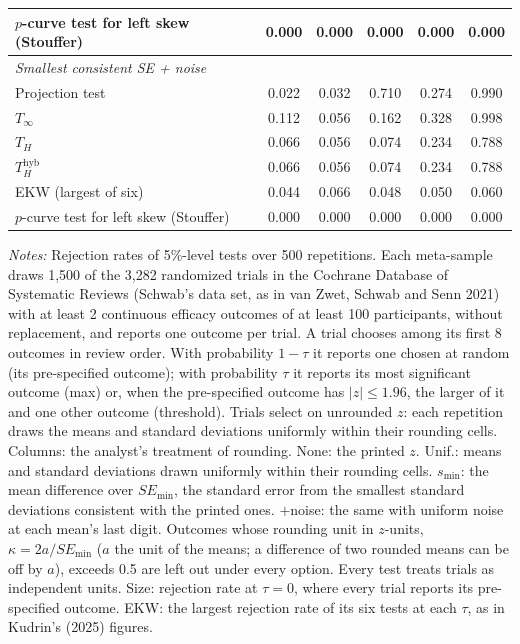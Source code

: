 \begin{table}[htbp]
\begin{tabular}{lccccc}
$p$-curve test for left skew (Stouffer) & 0.000 & 0.000 & 0.000 & 0.000 & 0.000 \\
\midrule
\multicolumn{6}{l}{\textit{Smallest consistent SE + noise}} \\
Projection test & 0.022 & 0.032 & 0.710 & 0.274 & 0.990 \\
$T_\infty$ & 0.112 & 0.056 & 0.162 & 0.328 & 0.998 \\
$T_H$ & 0.066 & 0.056 & 0.074 & 0.234 & 0.788 \\
$T_H^{\mathrm{hyb}}$ & 0.066 & 0.056 & 0.074 & 0.234 & 0.788 \\
EKW (largest of six) & 0.044 & 0.066 & 0.048 & 0.050 & 0.060 \\
$p$-curve test for left skew (Stouffer) & 0.000 & 0.000 & 0.000 & 0.000 & 0.000 \\
\bottomrule
\end{tabular}
\par\smallskip
\begin{minipage}{\linewidth}\footnotesize\textit{Notes:} Rejection rates of 5\%-level tests over 500 repetitions. Each meta-sample draws 1{,}500 of the 3{,}282 randomized trials in the Cochrane Database of Systematic Reviews (Schwab's data set, as in van Zwet, Schwab and Senn 2021) with at least 2 continuous efficacy outcomes of at least 100 participants, without replacement, and reports one outcome per trial. A trial chooses among its first 8 outcomes in review order. With probability $1 - \tau$ it reports one chosen at random (its pre-specified outcome); with probability $\tau$ it reports its most significant outcome (max) or, when the pre-specified outcome has $|z| \le 1.96$, the larger of it and one other outcome (threshold). Trials select on unrounded $z$: each repetition draws the means and standard deviations uniformly within their rounding cells. Columns: the analyst's treatment of rounding. None: the printed $z$. Unif.: means and standard deviations drawn uniformly within their rounding cells. $s_{\min}$: the mean difference over $SE_{\min}$, the standard error from the smallest standard deviations consistent with the printed ones. $+$noise: the same with uniform noise at each mean's last digit. Outcomes whose rounding unit in $z$-units, $\kappa = 2a/SE_{\min}$ ($a$ the unit of the means; a difference of two rounded means can be off by $a$), exceeds 0.5 are left out under every option. Every test treats trials as independent units. Size: rejection rate at $\tau = 0$, where every trial reports its pre-specified outcome. EKW: the largest rejection rate of its six tests at each $\tau$, as in Kudrin's (2025) figures.\end{minipage}
\end{table}
